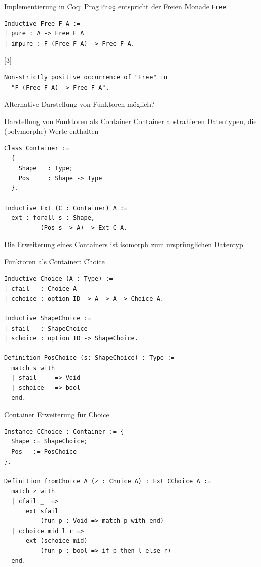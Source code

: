\documentclass{beamer}
\begin{document}
\begin{frame}[fragile]{Implementierung in Coq: Prog}
\texttt{Prog} entspricht der Freien Monade \texttt{Free}
\begin{verbatim}
Inductive Free F A :=
| pure : A -> Free F A
| impure : F (Free F A) -> Free F A.
\end{verbatim}
\hspace{.39\linewidth}
\scalebox{3}[3]{\MVArrowDown}
\begin{verbatim}
Non-strictly positive occurrence of "Free" in
  "F (Free F A) -> Free F A".
\end{verbatim}
\vfill
\MVRightArrow{} Alternative Darstellung von Funktoren möglich?
\end{frame}

\begin{frame}[fragile]{Darstellung von Funktoren als Container}
\alert{Container} abstrahieren Datentypen, die (polymorphe) Werte enthalten
\begin{verbatim}
Class Container :=
  {
    Shape   : Type;
    Pos     : Shape -> Type
  }.

Inductive Ext (C : Container) A := 
  ext : forall s : Shape,
          (Pos s -> A) -> Ext C A.
\end{verbatim}

Die \alert{Erweiterung eines Containers} ist isomorph zum ursprünglichen Datentyp
\end{frame}

\begin{frame}[fragile]{Funktoren als Container: Choice}
\begin{verbatim}
Inductive Choice (A : Type) :=
| cfail   : Choice A
| cchoice : option ID -> A -> A -> Choice A.

Inductive ShapeChoice :=
| sfail   : ShapeChoice
| schoice : option ID -> ShapeChoice.

Definition PosChoice (s: ShapeChoice) : Type :=
  match s with
  | sfail     => Void
  | schoice _ => bool
  end.
\end{verbatim}
\end{frame}

\begin{frame}[fragile]{Container Erweiterung für Choice}
\begin{verbatim}     
Instance CChoice : Container := {
  Shape := ShapeChoice;
  Pos   := PosChoice
}.

Definition fromChoice A (z : Choice A) : Ext CChoice A :=
  match z with
  | cfail _  => 
      ext sfail 
          (fun p : Void => match p with end)
  | cchoice mid l r =>
      ext (schoice mid) 
          (fun p : bool => if p then l else r)
  end.
\end{verbatim}
\end{frame}
\end{document}
